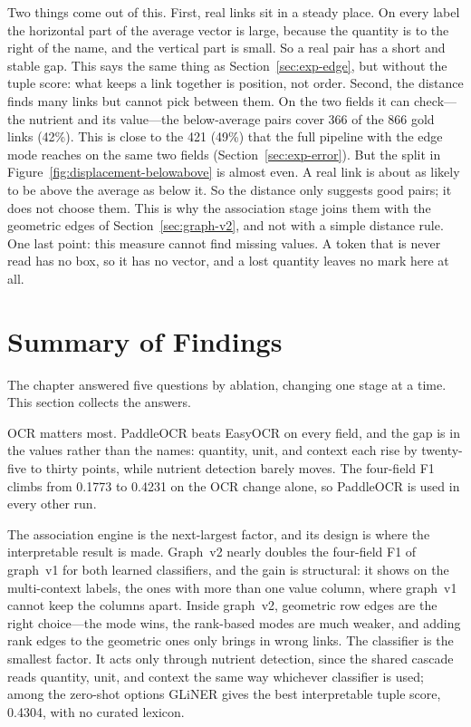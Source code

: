 Two things come out of this. First, real links sit in a steady place. On every
label the horizontal part of the average vector is large, because the quantity
is to the right of the name, and the vertical part is small. So a real pair has
a short and stable gap. This says the same thing as Section~\ref{sec:exp-edge},
but without the tuple score: what keeps a link together is position, not order.
Second, the distance finds many links but cannot pick between them. On the two
fields it can check---the nutrient and its value---the below-average pairs
cover 366 of the 866 gold links (42\%). This is close to the 421 (49\%) that
the full pipeline with the  edge mode reaches on the same two
fields (Section~\ref{sec:exp-error}).
But the split in Figure~\ref{fig:displacement-belowabove} is almost even. A
real link is about as likely to be above the average as below it. So the
distance only suggests good pairs; it does not choose them. This is why the
association stage joins them with the geometric edges of
Section~\ref{sec:graph-v2}, and not with a simple distance rule. One last
point: this measure cannot find missing values. A token that is never read has
no box, so it has no vector, and a lost quantity leaves no mark here at all.


\section{Summary of Findings}\label{sec:exp-summary}

The chapter answered five questions by ablation, changing one stage at a
time. This section collects the answers.

OCR matters most. PaddleOCR beats EasyOCR on every field, and the gap is in
the values rather than the names: quantity, unit, and context each rise by
twenty-five to thirty points, while nutrient detection barely moves. The
four-field F1 climbs from 0.1773 to 0.4231 on the OCR change alone, so
PaddleOCR is used in every other run.

The association engine is the next-largest factor, and its design is where
the interpretable result is made. Graph~v2 nearly doubles the four-field F1
of graph~v1 for both learned classifiers, and the gain is structural: it
shows on the multi-context labels, the ones with more than one value column,
where graph~v1 cannot keep the columns apart. Inside graph~v2, geometric row
edges are the right choice---the  mode wins, the rank-based
modes are much weaker, and adding rank edges to the geometric ones only
brings in wrong links. The classifier is the smallest factor. It acts only
through nutrient detection, since the shared cascade reads quantity, unit,
and context the same way whichever classifier is used; among the zero-shot
options GLiNER gives the best interpretable tuple score, 0.4304, with no
curated lexicon.

